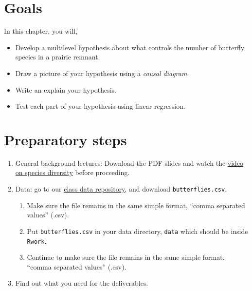\documentclass[
  letterpaper,
  DIV=11,
  numbers=noendperiod]{scrreprt}
\providecommand{\tightlist}{%
  \setlength{\itemsep}{0pt}\setlength{\parskip}{0pt}}
\begin{document}
\section{Goals}\label{goals-10}

In this chapter, you will,

\begin{itemize}
\tightlist
\item
  Develop a multilevel hypothesis about what controls the number of
  butterfly species in a prairie remnant.
\item
  Draw a picture of your hypothesis using a \emph{causal diagram}.
\item
  Write an explain your hypothesis.
\item
  Test each part of your hypothesis using linear regression.
\end{itemize}

\section{Preparatory steps}\label{preparatory-steps-7}

\begin{enumerate}
\def\labelenumi{\arabic{enumi}.}
\tightlist
\item
  General background lectures: Download the PDF slides and watch the
  \href{https://drive.google.com/drive/folders/1nWLoEGuWKIWdul9Uvse5qiB1Hf8MCwUv?usp=sharing}{video
  on species diversity} before proceeding.
\item
  Data: go to our
  \href{https://drive.google.com/drive/u/1/folders/1FR2FLiW3xyD4Er52YzVTToPZuXXReGRo}{class
  data repository}, and download \texttt{butterflies.csv}.

  \begin{enumerate}
  \def\labelenumii{\alph{enumii}.}
  \tightlist
  \item
    Make sure the file remains in the same simple format, ``comma
    separated values'' (.csv).
  \item
    Put \texttt{butterflies.csv} in your data directory, \texttt{data}
    which should be inside \texttt{Rwork}.
  \item
    Continue to make sure the file remains in the same simple format,
    ``comma separated values'' (.csv).
  \end{enumerate}
\item
  Find out what you need for the deliverables.
\end{enumerate}
\end{document}
